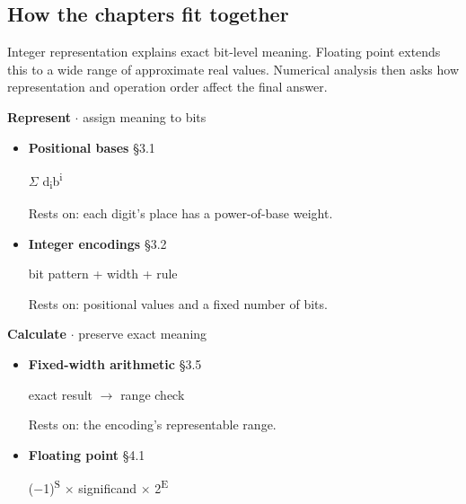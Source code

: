 \documentclass[11pt]{article}
\begin{document}
\begin{keepsection}
\section{How the chapters fit together}

Integer representation explains exact bit-level meaning. Floating point extends this to a wide range of approximate real values. Numerical analysis then asks how representation and operation order affect the final answer.

\textbf{Represent} \ensuremath{\cdot} assign meaning to bits

\begin{itemize}
\item 
{}
\textbf{Positional bases} \hfill{\small\color{FAUblue}§3.1}

\ensuremath{\Sigma} d\textsubscript{i}b\textsuperscript{i}

Rests on: each digit's place has a power-of-base weight.

\item 
{}
\textbf{Integer encodings} \hfill{\small\color{FAUblue}§3.2}

bit pattern + width + rule

Rests on: positional values and a fixed number of bits.

\end{itemize}

\textbf{Calculate} \ensuremath{\cdot} preserve exact meaning

\begin{itemize}
\item 
{}
\textbf{Fixed-width arithmetic} \hfill{\small\color{FAUblue}§3.5}

exact result \ensuremath{\to} range check

Rests on: the encoding's representable range.

\item 
{}
\textbf{Floating point} \hfill{\small\color{FAUblue}§4.1}

(\ensuremath{-}1)\textsuperscript{S} \ensuremath{\times} significand \ensuremath{\times} 2\textsuperscript{E}


\end{itemize}
\end{keepsection}
\end{document}
